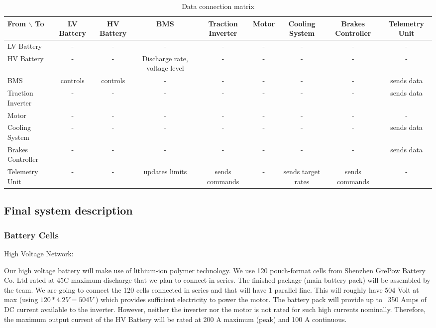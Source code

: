\begin{table}
    \centering
    \begin{adjustbox}{width=\textwidth,center}
    \begin{tabular}{|l|c|c|c|c|c|c|c|c|}
    \hline
    From $\backslash$ To & LV Battery & HV Battery & BMS & Traction Inverter & Motor & Cooling System & Brakes Controller & Telemetry Unit  \\
    \hline
    LV Battery & - & - & - & - & - & - & - & - \\
    HV Battery  & - & - & Discharge rate, voltage level & - & - & - & - & - \\
    BMS & controls & controls & - & - & - & - & - & sends data \\
    Traction Inverter & - & - & - & - & - & - & - & sends data \\
    Motor & - & - & - & - & - & - & - & - \\
    Cooling System & - & - & - & - & - & - & - & sends data \\
    Brakes Controller & - & - & - & - & - & - & - & sends data \\
    Telemetry Unit & - & - & updates limits & sends commands & - & sends target rates & sends commands & - \\
    \hline
    \end{tabular}
    \end{adjustbox}
    \caption{Data connection matrix}
    \label{data-connectivity-matrix}
\end{table}


\subsection{Final system description}
\subsubsection{Battery Cells}

High Voltage Network:

Our high voltage battery will make use of lithium-ion polymer technology. We use 120 pouch-format cells from Shenzhen GrePow Battery Co. Ltd rated at 45C maximum discharge that we plan to connect in series. 
The finished package (main battery pack) will be assembled by the team.
We are going to connect the 120 cells connected in series and that will have 1 parallel line. This will roughly have 504 Volt at max (using \(120 * 4.2V = 504 V \) ) 
which provides sufficient electricity to power the motor.
The battery pack will provide up to ~350 Amps of DC current available to the inverter. However, neither the inverter nor the motor is not rated for such high currents nominally. 
\newline
Therefore, the maximum output current of the HV Battery will be rated at 200 A maximum (peak) and 100 A continuous. 

